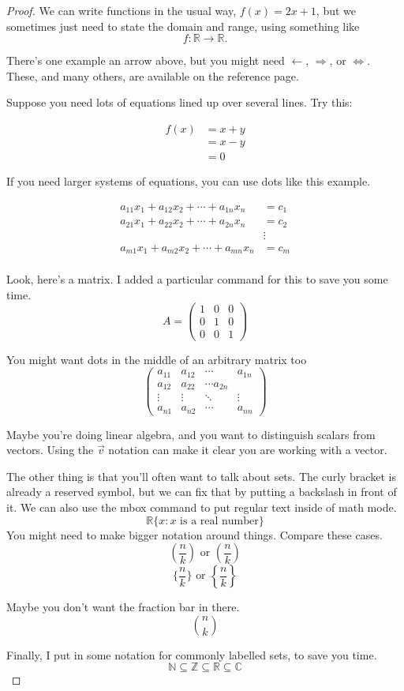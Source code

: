 \documentclass[12 pt]{article}
\theoremstyle{definition}
\newcommand{\C}{\mathbb{C}}
\newcommand{\R}{\mathbb{R}}
\newcommand{\N}{\mathbb{N}}
\newcommand{\Z}{\mathbb{Z}}
\newcommand\m[1]{\begin{pmatrix}#1\end{pmatrix}}
\begin{document}
\begin{proof}
We can write functions in the usual way, $f(x) = 2x +1$, but we sometimes just need to state the domain and range, using something like $$f: \R \rightarrow \R.$$

There's one example an arrow above, but you might need $\leftarrow$, $\Rightarrow$, or $\iff$. These, and many others, are available on the reference page.

Suppose you need lots of equations lined up over several lines. Try this:

\begin{align*}
f(x) &= x+y\\
&= x-y\\
&=0
\end{align*}

If you need larger systems of equations, you can use dots like this example.

\begin{align*}
    a_{11}x_1 + a_{12}x_2 + \cdots + a_{1n}x_n &= c_1\\
    a_{21}x_1 + a_{22}x_2 + \cdots + a_{2n}x_n &= c_2\\
    &\vdots\\
    a_{m1}x_1 + a_{m2}x_2 + \cdots + a_{mn}x_n &= c_m\\
\end{align*}


Look, here's a matrix. I added a particular command for this to save you some time.
$$A = \m{1&0&0\\0&1&0\\0&0&1}$$

You might want dots in the middle of an arbitrary matrix too
$$\m{a_{11}&a_{12}&\cdots& a_{1n}\\
a_{12}&a_{22}&\cdots a_{2n}\\
\vdots&\vdots&\ddots&\vdots\\
a_{n1}&a_{n2}&\cdots& a_{nn}}$$

Maybe you're doing linear algebra, and you want to distinguish scalars from vectors. Using the $\vec{v}$ notation can make it clear you are working with a vector.

The other thing is that you'll often want to talk about sets. The curly bracket is already a reserved symbol, but we can fix that by putting a backslash in front of it. We can also use the mbox command to put regular text inside of math mode.
$$\R \{x:x \mbox{ is a real number}\}$$
You might need to make bigger notation around things. Compare these cases.
$$(\frac{n}{k})\mbox{ or }\left(\frac{n}{k}\right)$$
$$\{\frac{n}{k}\}\mbox{ or }\left\{\frac{n}{k}\right\}$$

Maybe you don't want the fraction bar in there. 
$${n \choose k}$$

Finally, I put in some notation for commonly labelled sets, to save you time.
$$\N \subseteq \Z \subseteq \R \subseteq \C$$

\end{proof}

 
\end{document}
